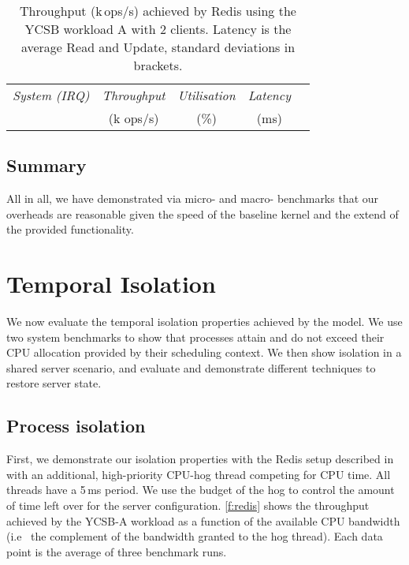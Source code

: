\begin{table}[t]\centering
      \begin{tabular}{lcccc}\toprule
        \emph{System (IRQ)}  & \emph{Throughput} & \emph{Utilisation} &  \emph{Latency} \\
                               & (k ops/s)     &  (\%)            &   (ms)            \\
        \midrule
      
      \bottomrule
    \end{tabular}
    \caption{Throughput (k\,ops/s) achieved by Redis using the YCSB
      workload A with 2 clients.  Latency is the average Read and Update,
      standard deviations in brackets.}
    \label{t:redis}
\end{table}

\subsection{Summary}

All in all, we have demonstrated via micro- and macro- benchmarks that our overheads are
reasonable given the speed of the baseline kernel and the extend of the provided
functionality. 
\clearpage

\section{Temporal Isolation}

We now evaluate the temporal isolation properties achieved by the model. We use
two system benchmarks to show that processes attain and do not exceed their
CPU allocation provided by their scheduling context. We then show isolation in a shared
server scenario, and evaluate and demonstrate different techniques to restore server state.

\subsection{Process isolation} 

First, we demonstrate our isolation properties with the Redis setup described in
 with an additional, high-priority CPU-hog thread
competing for \gls{CPU} time.  All threads have a
5\,ms period. We use the budget of the hog to control the amount of time left over
for the server configuration. \autoref{f:redis} shows the throughput
achieved by the YCSB-A workload as a function of the available CPU
bandwidth (i.e \ the complement of the bandwidth granted to the hog
thread). Each data point is the average of three benchmark runs.

